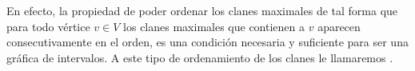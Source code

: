 En efecto, la propiedad de poder ordenar los clanes maximales de tal forma que para todo vértice $v\in V$ los clanes maximales que contienen a $v$ aparecen consecutivamente en el orden, es una condición necesaria y suficiente para ser una gráfica de intervalos. A este tipo de ordenamiento de los clanes le llamaremos .


